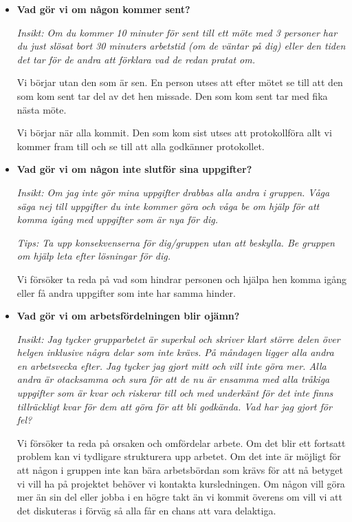 \documentclass{mall}
\begin{document}
\begin{itemize}
\item \textbf{Vad gör vi om någon kommer sent?}

  \emph{Insikt: Om du kommer 10 minuter för sent till ett möte med 3 personer har du just slösat bort 30
  minuters arbetstid (om de väntar på dig) eller den tiden det tar för de andra att förklara vad de
  redan pratat om.}

  Vi börjar utan den som är sen. En person utses att efter mötet se till att den som kom sent tar
  del av det hen missade. Den som kom sent tar med fika nästa möte.
  
  Vi börjar när alla kommit. Den som kom sist utses att protokollföra allt vi kommer fram till och
  se till att alla godkänner protokollet.

\item \textbf{Vad gör vi om någon inte slutför sina uppgifter?}

  \emph{Insikt: Om jag inte gör mina uppgifter drabbas alla andra i gruppen. Våga säga nej till uppgifter
  du inte kommer göra och våga be om hjälp för att komma igång med uppgifter som är nya för dig.}
  
  \emph{Tips: Ta upp konsekvenserna för dig/gruppen utan att beskylla. Be gruppen om hjälp leta efter
  lösningar för dig.}
  
  Vi försöker ta reda på vad som hindrar personen och hjälpa hen komma igång eller få andra
  uppgifter som inte har samma hinder.

\item \textbf{Vad gör vi om arbetsfördelningen blir ojämn?}

 \emph{Insikt: Jag tycker grupparbetet är superkul och skriver klart större delen över helgen inklusive
  några delar som inte krävs. På måndagen ligger alla andra en arbetsvecka efter. Jag tycker jag
  gjort mitt och vill inte göra mer. Alla andra är otacksamma och sura för att de nu är ensamma med
  alla tråkiga uppgifter som är kvar och riskerar till och med underkänt för det inte finns
  tillräckligt kvar för dem att göra för att bli godkända. Vad har jag gjort för fel?}

 Vi försöker ta reda på orsaken och omfördelar arbete. Om det blir ett fortsatt problem kan vi tydligare
 strukturera upp arbetet. Om det inte är möjligt för att någon i gruppen inte kan bära arbetsbördan som
 krävs för att nå betyget vi vill ha på projektet behöver vi kontakta kursledningen. Om någon vill göra
 mer än sin del eller jobba i en högre takt än vi kommit överens om vill vi att det diskuteras i förväg
 så alla får en chans att vara delaktiga.


\end{itemize}
\end{document}
